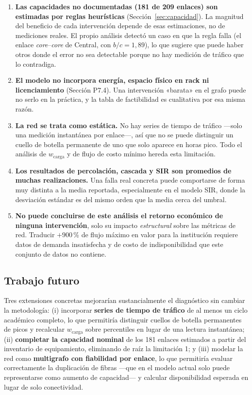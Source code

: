 \documentclass[10pt,a4paper]{extarticle}
\begin{document}
\begin{enumerate}[leftmargin=*,itemsep=1.5mm]
\item \textbf{Las capacidades no documentadas (181 de 209 enlaces) son estimadas por reglas
heurísticas} (Sección~\ref{sec:capacidad}). La magnitud del beneficio de cada intervención
depende de esas estimaciones, no de mediciones reales. El propio análisis detectó un caso en
que la regla falla (el enlace \textit{core}--\textit{core} de Central, con $b/c = 1{,}89$), lo
que sugiere que puede haber otros donde el error no sea detectable porque no hay medición de
tráfico que lo contradiga.

\item \textbf{El modelo no incorpora energía, espacio físico en rack ni licenciamiento}
(Sección P7.4). Una intervención «barata» en el grafo puede no serlo en la práctica, y la
tabla de factibilidad es cualitativa por esa misma razón.

\item \textbf{La red se trata como estática.} No hay series de tiempo de tráfico ---solo una
medición instantánea por enlace---, así que no se puede distinguir un cuello de botella
permanente de uno que solo aparece en horas pico. Todo el análisis de $w_{\text{carga}}$ y de
flujo de costo mínimo hereda esta limitación.

\item \textbf{Los resultados de percolación, cascada y SIR son promedios de muchas
realizaciones.} Una falla real concreta puede comportarse de forma muy distinta a la media
reportada, especialmente en el modelo SIR, donde la desviación estándar es del mismo orden
que la media cerca del umbral.

\item \textbf{No puede concluirse de este análisis el retorno económico de ninguna
intervención}, solo su impacto \textit{estructural} sobre las métricas de red. Traducir
$+900$\,\% de flujo máximo en valor para la institución requiere datos de demanda insatisfecha
y de costo de indisponibilidad que este conjunto de datos no contiene.
\end{enumerate}

\subsection{Trabajo futuro}

Tres extensiones concretas mejorarían sustancialmente el diagnóstico sin cambiar la
metodología: (i) incorporar \textbf{series de tiempo de tráfico} de al menos un ciclo
académico completo, lo que permitiría distinguir cuellos de botella permanentes de picos y
recalcular $w_{\text{carga}}$ sobre percentiles en lugar de una lectura instantánea;
(ii) \textbf{completar la capacidad nominal} de los 181 enlaces estimados a partir del
inventario de equipamiento, eliminando de raíz la limitación 1; y (iii) modelar la red como
\textbf{multigrafo con fiabilidad por enlace}, lo que permitiría evaluar correctamente la
duplicación de fibras ---que en el modelo actual solo puede representarse como aumento de
capacidad--- y calcular disponibilidad esperada en lugar de solo conectividad.
\end{document}
